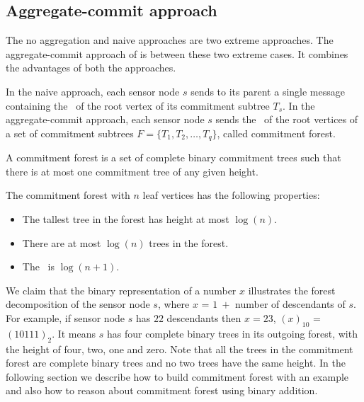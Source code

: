 	\subsection{Aggregate-commit approach}
		The no aggregation and naive approaches are two extreme approaches.
		The aggregate-commit approach of \cite{chan2006secure} is between these two extreme cases. It combines the advantages of both the approaches.

		In the naive approach, each sensor node $s$ sends to its parent a single message containing the \payload\ of the root vertex of its commitment subtree $T_{s}$.
		In the aggregate-commit approach, each sensor node $s$ sends the \payloads\ of the root vertices of a set of commitment subtrees $F = \{ T_{1},T_{2},\dotsc,T_{q} \} $, called commitment forest. 

		\begin{definition}\cite{chan2006secure}
			A commitment forest is a set of complete binary commitment trees such that there is	at most one commitment tree of any given height.
		\end{definition}
		The commitment forest with $n$ leaf vertices has the following properties:
		\begin{itemize}
			\item The tallest tree in the forest has height at most $\log(n)$.
			\item There are at most $\log(n)$ trees in the forest.
			\item The \inforate\ is $\log(n+1)$.
		\end{itemize}
		We claim that the binary representation of a number $x$ illustrates the forest decomposition of the sensor node $s$, where $x$ = $1\ +$ number of descendants of $s$.
		For example, if sensor node $s$ has $22$ descendants then $x =23$, $(x)_{10}$ = $(10111)_{2}$. 
		It means $s$ has four complete binary trees in its outgoing forest, with the height of four, two, one and zero.
		Note that all the trees in the commitment forest are complete binary trees and no two trees have the same height.
		In the following section we describe how to build commitment forest with an example and also how to reason about commitment forest using binary addition. 


